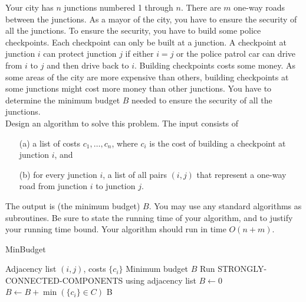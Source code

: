 \noindent {} 
Your city has $n$ junctions numbered 1 through $n$. There are $m$ one-way roads between the junctions. As a mayor of the city, you have to ensure the security of all the junctions. To ensure the security, you have to build some police checkpoints. Each checkpoint can only be built at a junction. A checkpoint at junction $i$ can protect junction $j$ if either $i = j$ or the police patrol car can drive from $i$ to $j$ and then drive back to $i$. Building checkpoints costs some money. As some areas of the city are more expensive than others, building checkpoints at some junctions might cost more money than other junctions. You
have to determine the minimum budget $B$ needed to ensure the security of all the junctions.\\
Design an algorithm to solve this problem. The input consists of
\begin{itemize}
    \item[(a)] a list of costs $c_1, \dots, c_n$, where $c_i$ is the cost of building a checkpoint at junction $i$, and
    \item[(b)] for every junction $i$, a list of all pairs $(i, j)$ that represent a one-way road from junction $i$ to junction $j$.
\end{itemize}
The output is (the minimum budget) $B$. 
You may use any standard algorithms as subroutines. Be sure to state the running time of your algorithm, and to justify your running time bound. Your algorithm should run in time $O(n + m)$. \\
\vspace{-10pt}
\begin{algorithm}[!ht]
\caption{MinBudget} \label{alg:budget}
\begin{algorithmic}[1]
    \Require Adjacency list $(i, j)$, costs $\{c_i\}$
    \Ensure Minimum budget $B$
    \State Run STRONGLY-CONNECTED-COMPONENTS using adjacency list
    \State $B \leftarrow 0$
     
        \State $B \leftarrow B + \min(\{c_i\} \in C)$
    \EndFor
    \State \Return B
\end{algorithmic}
\end{algorithm}